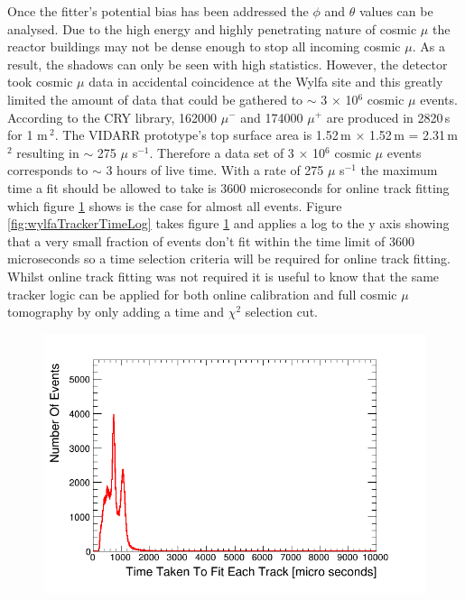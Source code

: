 Once the fitter's potential bias has been addressed the $\phi$ and $\theta$ values can be analysed. Due to the high energy and highly penetrating nature of cosmic $\mu$ \cite{Olive_2014} the reactor buildings may not be dense enough to stop all incoming cosmic $\mu$. As a result, the shadows can only be seen with high statistics. However, the detector took cosmic $\mu$ data in accidental coincidence at the Wylfa site and this greatly limited the amount of data that could be gathered to $\sim$ 3 $\times$ 10$^6$ cosmic $\mu$ events. According to the CRY library, \cite{ieee_cry_2007} 162000 $\mu^-$ and 174000 $\mu^+$ are produced in 2820\,s for 1 m\,$^2$. The VIDARR prototype's top surface area is 1.52\,m $\times$ 1.52\,m = 2.31\,m$^2$ resulting in $\sim$ 275 $\mu$ s$^{-1}$. Therefore a data set of 3 $\times$ 10$^6$ cosmic $\mu$ events corresponds to $\sim$ 3 hours of live time. With a rate of 275 $\mu$ s$^{-1}$ the maximum time a fit should be allowed to take is 3600 microseconds for online track fitting which figure \ref{fig:wylfaTrackerTime} shows is the case for almost all events. Figure \ref{fig:wylfaTrackerTimeLog} takes figure \ref{fig:wylfaTrackerTime} and applies a log to the y axis showing that a very small fraction of events don't fit within the time limit of 3600 microseconds so a time selection criteria will be required for online track fitting. Whilst online track fitting was not required it is useful to know that the same tracker logic can be applied for both online calibration and full cosmic $\mu$ tomography by only adding a time and $\chi^2$ selection cut. 

 \begin{figure}[!h]
 \centering
 \includegraphics[width=0.7\linewidth]{Chapter5/Figs/Raster/wylfaTrackerTime.png}
 \label{fig:wylfaTrackerTime}
\end{figure}

